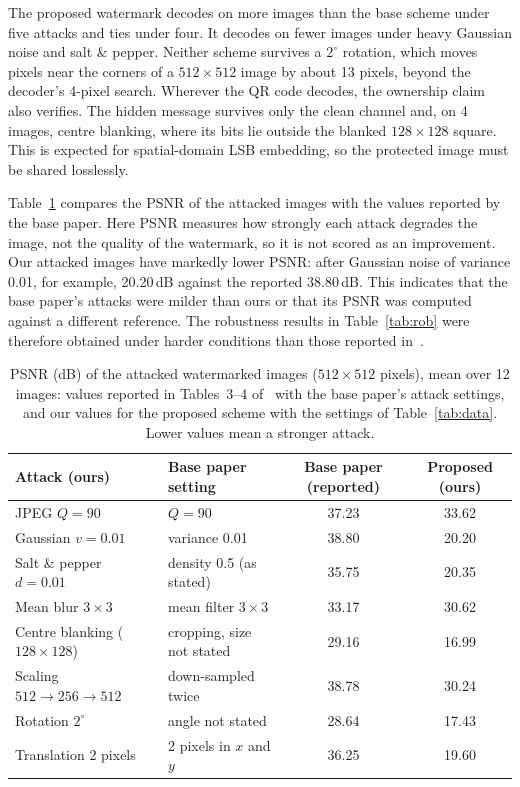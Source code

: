 \documentclass[11pt,a4paper]{article}
\begin{document}
The proposed watermark decodes on more images than the base scheme under five attacks and ties under four. It decodes on fewer images under heavy Gaussian noise and salt \& pepper. Neither scheme survives a $2^\circ$ rotation, which moves pixels near the corners of a $512\times512$ image by about 13 pixels, beyond the decoder's 4-pixel search. Wherever the QR code decodes, the ownership claim also verifies. The hidden message survives only the clean channel and, on 4 images, centre blanking, where its bits lie outside the blanked $128\times128$ square. This is expected for spatial-domain LSB embedding, so the protected image must be shared losslessly.

Table~\ref{tab:psnr-att} compares the PSNR of the attacked images with the values reported by the base paper. Here PSNR measures how strongly each attack degrades the image, not the quality of the watermark, so it is not scored as an improvement. Our attacked images have markedly lower PSNR: after Gaussian noise of variance 0.01, for example, 20.20\,dB against the reported 38.80\,dB. This indicates that the base paper's attacks were milder than ours or that its PSNR was computed against a different reference. The robustness results in Table~\ref{tab:rob} were therefore obtained under harder conditions than those reported in~\cite{sanivarapu2022}.

\begin{table}[!htbp]
\centering\small
\caption{PSNR (dB) of the attacked watermarked images ($512\times512$ pixels), mean over 12 images: values reported in Tables~3--4 of~\cite{sanivarapu2022} with the base paper's attack settings, and our values for the proposed scheme with the settings of Table~\ref{tab:data}. Lower values mean a stronger attack.}\label{tab:psnr-att}
\begin{tabular}{@{}llcc@{}}
\toprule
Attack (ours) & Base paper setting & Base paper (reported) & Proposed (ours) \\
\midrule
JPEG $Q=90$ & $Q=90$ & 37.23 & 33.62 \\
Gaussian $v=0.01$ & variance 0.01 & 38.80 & 20.20 \\
Salt \& pepper $d=0.01$ & density 0.5 (as stated) & 35.75 & 20.35 \\
Mean blur $3\times3$ & mean filter $3\times3$ & 33.17 & 30.62 \\
Centre blanking ($128\times128$) & cropping, size not stated & 29.16 & 16.99 \\
Scaling $512\to256\to512$ & down-sampled twice & 38.78 & 30.24 \\
Rotation $2^\circ$ & angle not stated & 28.64 & 17.43 \\
Translation 2 pixels & 2 pixels in $x$ and $y$ & 36.25 & 19.60 \\
\bottomrule
\end{tabular}
\end{table}
\end{document}

